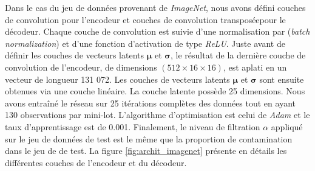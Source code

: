 Dans le cas du jeu de données provenant de \textit{ImageNet}, nous avons défini \DIFdelbegin {}\DIFdelend \DIFaddbegin {}\DIFaddend couches de convolution pour l'encodeur et \DIFdelbegin {}\DIFdelend \DIFaddbegin {}\DIFaddend couches de convolution transposée\DIFaddbegin {}\DIFaddend pour le décodeur. Chaque couche de convolution est suivie d'une normalisation par \DIFdelbegin {}\DIFdelend \DIFaddbegin {}\DIFaddend (\textit{batch normalization}) et d'une fonction d'activation de type \textit{ReLU}. Juste avant de définir les couches de vecteurs latents $\boldsymbol{\mu}$ et $\boldsymbol{\sigma}$, le résultat de la dernière couche de convolution de l'encodeur, de dimensions $(512 \times 16 \times 16)$, est aplati en un vecteur de longueur 131 072. Les couches de vecteurs latents $\boldsymbol{\mu}$ et $\boldsymbol{\sigma}$ sont ensuite obtenues via une couche linéaire. La couche latente possède 25 dimensions. Nous avons entraîné le réseau sur 25 itérations complètes des données tout en ayant 130 observations par mini-lot. L'algorithme d'optimisation est celui de \textit{Adam} \citep{kingma2014method} et le taux d'apprentissage est de 0.001. Finalement, le niveau de filtration $\alpha$ appliqué sur le jeu de données de test est le même que la proportion de contamination dans le jeu de \DIFdelbegin {}\DIFdelend \DIFaddbegin {}\DIFaddend de test. La figure \ref{fig:archit_imagenet} présente en détails les différentes couches de l'encodeur et du décodeur.

